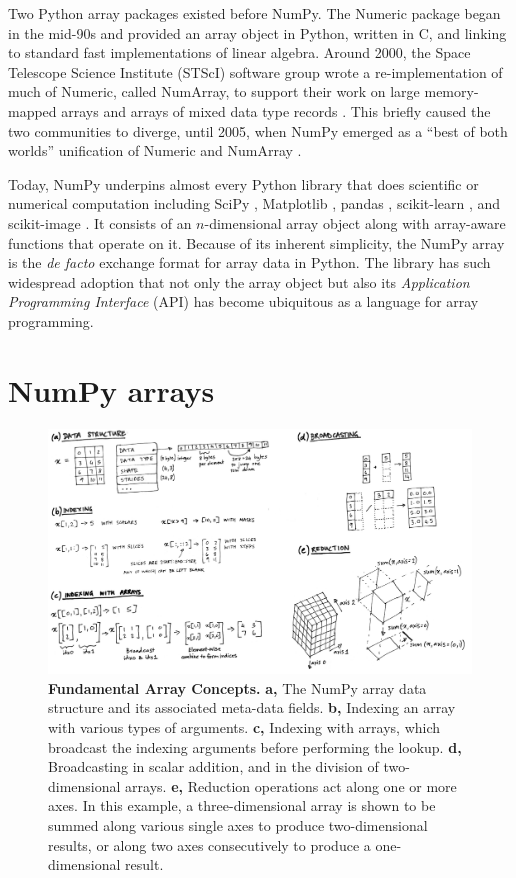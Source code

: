 Two Python array packages existed before NumPy.
The Numeric package began in the mid-90s and provided an array object in
Python, written in C, and linking to standard fast implementations of linear
algebra.
Around 2000, the Space Telescope Science Institute (STScI) software group wrote
a re-implementation of much of Numeric, called NumArray, to support their work
on large memory-mapped arrays and arrays of mixed data type
records \cite{STScI-slither}.
This briefly caused the two communities to diverge, until
2005, when NumPy emerged as a ``best of both worlds'' unification of Numeric
and NumArray \cite{oliphant2006guide}.

Today, NumPy underpins almost every Python library that does scientific or
numerical computation including SciPy \cite{virtanen2019scipy},
Matplotlib \cite{hunter2007matplotlib}, pandas \cite{mckinney-proc-scipy-2010},
scikit-learn \cite{pedregosa2011scikit}, and
scikit-image \cite{vanderwalt2014scikit}.
It consists of an $n$-dimensional array object along with array-aware functions
that operate on it.
Because of its inherent simplicity, the NumPy array is
the {\it de facto} exchange format for array data in Python.
The library has such widespread adoption that not only the array object but also its
{\it Application Programming Interface} (API) has become ubiquitous as
a language for array programming.

\section*{NumPy arrays}

\begin{figure}
  \centering
  \includegraphics[width=.9\textwidth]{static/sketches/array-concepts}   
  \caption{\textbf{Fundamental Array Concepts.}
    \textbf{a,} The NumPy array data structure and its associated meta-data fields.
    \textbf{b,} Indexing an array with various types of arguments.
    \textbf{c,} Indexing with arrays, which broadcast the indexing arguments before performing the lookup.
    \textbf{d,} Broadcasting in scalar addition, and in the division of two-dimensional arrays.
    \textbf{e,} Reduction operations act along one or more axes. In this
    example, a three-dimensional array is shown to be summed along various single
    axes to produce two-dimensional results, or along two axes consecutively to
    produce a one-dimensional result.
   }
  \label{fig:array-concepts}
\end{figure}

